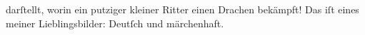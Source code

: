 \begin{ledgroupsized}[t]{13cm}
                  darſtellt, worin ein putziger kleiner Ritter einen Drachen bekämpft! Das iſt eines
                  meiner Lieblingsbilder: Deutſch und märchenhaft.\pend
           
         
         \endnumbering{}\end{ledgroupsized}  \newcommand{\dateiname}{L02623}\newcommand{\titel}{Paul Goldmann an Arthur Schnitzler, 1. 6. [1894]}\newcommand{\editorInnen}{Martin Anton Müller und Laura Untner}
      